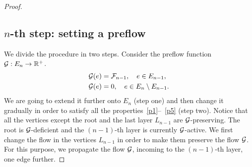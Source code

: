 \documentclass[12pt,oneside,a4paper]{amsart}
\begin{document}
\begin{proof}
      \subsection{\texorpdfstring{$n$}{n}-th step: setting a preflow}
        We divide the procedure in two steps.
        Consider the preflow function $\cal{G}: E_n \to \mathbb{R}^{+}$.
        \begin{align*}
          &\cal{G}(e) = \flowposn{n-1}, \quad e \in E_{n-1},\\
          &\cal{G}(e) = 0, \quad e \in E_n \setminus E_{n-1}.
        \end{align*}
        We are going to extend it further onto $E_n$ (step one) and then change it gradually in order
          to satisfy all the properties~\ref{p1}--~\ref{p5} (step two).
        Notice that all the vertices except the root and the last layer $L_{n-1}$ are $\cal{G}$-preserving.
        The root is $\cal{G}$-deficient and the $(n-1)$-th layer is currently $\cal{G}$-active.
        We first change the flow in the vertices $L_{n-1}$ in order to make them preserve the flow $\cal{G}$.
        For this purpose, we propagate the flow $\cal{G}$, incoming to the $(n-1)$-th layer, one edge further.


\end{proof}
\end{document}
